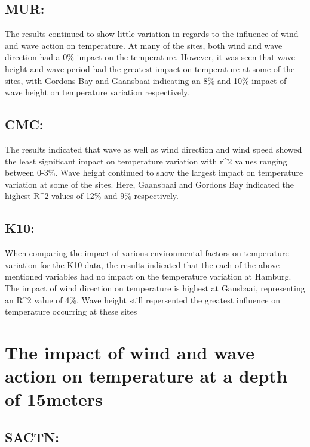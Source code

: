 \documentclass[12pt,]{article}
\begin{document}
\subsection{MUR:}\label{mur}

The results continued to show little variation in regards to the
influence of wind and wave action on temperature. At many of the sites,
both wind and wave direction had a 0\% impact on the temperature.
However, it was seen that wave height and wave period had the greatest
impact on temperature at some of the sites, with Gordons Bay and
Gaansbaai indicating an 8\% and 10\% impact of wave height on
temperature variation respectively.

\subsection{CMC:}\label{cmc}

The results indicated that wave as well as wind direction and wind speed
showed the least significant impact on temperature variation with r\^{}2
values ranging between 0-3\%. Wave height continued to show the largest
impact on temperature variation at some of the sites. Here, Gaansbaai
and Gordons Bay indicated the highest R\^{}2 values of 12\% and 9\%
respectively.

\subsection{K10:}\label{k10}

When comparing the impact of various environmental factors on
temperature variation for the K10 data, the results indicated that the
each of the above-mentioned variables had no impact on the temperature
variation at Hamburg. The impact of wind direction on temperature is
highest at Gansbaai, representing an R\^{}2 value of 4\%. Wave height
still repersented the greatest influence on temperature occurring at
these sites

\section{The impact of wind and wave action on temperature at a depth of
15meters}\label{the-impact-of-wind-and-wave-action-on-temperature-at-a-depth-of-15meters}

\subsection{SACTN:}\label{sactn-1}
\end{document}
